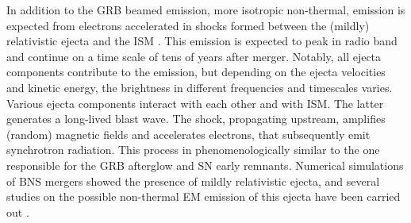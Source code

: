 In addition to the \ac{GRB} beamed emission, more isotropic non-thermal,
emission is expected from electrons accelerated in shocks formed between the 
(mildly) relativistic ejecta and the \ac{ISM} \citep{Nakar:2011cw}. This emission 
is expected to peak in radio band and continue on a time scale of tens of years 
after merger. Notably, all ejecta components contribute to the emission, 
but depending on the ejecta velocities and kinetic energy, 
the brightness in different frequencies and timescales varies. 
%
Various ejecta components interact with each other and with \ac{ISM}. The latter 
generates a long-lived blast wave. The shock, propagating upstream, amplifies 
(random) magnetic fields and accelerates electrons, that subsequently emit 
synchrotron radiation. This process in phenomenologically similar 
to the one responsible for the \ac{GRB} afterglow and \ac{SN} early remnants. 
%
Numerical simulations of \ac{BNS} mergers showed the presence of mildly relativistic 
ejecta, %
and several studies on the possible non-thermal \ac{EM} emission of this ejecta 
have been carried out 
\citep[\eg][]{Piran:2012wd,Hotokezaka:2015eja,Hotokezaka:2018gmo,Radice:2018pdn}. 
%
%
%






